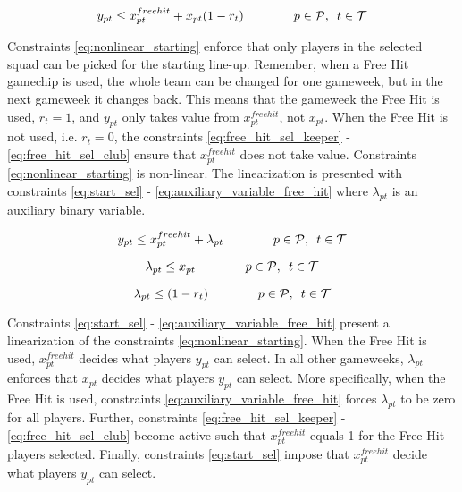 \begin{equation} \label{eq:nonlinear_starting}
    y_{pt} \leq x_{pt}^{free hit} + x_{pt}(1-r_{t}) \qquad\qquad  p \in \mathcal{P}, \enskip t \in \mathcal{T}
\end{equation}

Constraints \eqref{eq:nonlinear_starting} enforce that only players in the selected squad can be picked for the starting line-up. Remember, when a Free Hit gamechip is used, the whole team can be changed for one gameweek, but in the next gameweek it changes back. This means that the gameweek the Free Hit is used, $r_{t} = 1$, and $y_{pt}$ only takes value from $x_{pt}^{free hit}$, not $x_{pt}$. When the Free Hit is not used, i.e. $r_{t} = 0$, the constraints \eqref{eq:free_hit_sel_keeper} - \eqref{eq:free_hit_sel_club} ensure that $x_{pt}^{free hit}$ does not take value. Constraints \eqref{eq:nonlinear_starting} is non-linear. The linearization is presented with constraints \eqref{eq:start_sel} - \eqref{eq:auxiliary_variable_free_hit} where $\lambda_{pt}$ is an auxiliary binary variable.


\begin{equation}\label{eq:start_sel}
    y_{pt} \leq x_{pt}^{free hit} + \lambda_{pt} \qquad\qquad  p \in \mathcal{P}, \enskip t \in \mathcal{T}
\end{equation}

\begin{equation} \label{eq:auxiliary_variable_x}
    \lambda_{pt} \leq {x}_{pt}  \qquad\qquad  p \in \mathcal{P}, \enskip t \in \mathcal{T}
\end{equation}

\begin{equation} \label{eq:auxiliary_variable_free_hit}
    \lambda_{pt} \leq (1-r_{t}) \qquad\qquad  p \in \mathcal{P}, \enskip t \in \mathcal{T}
\end{equation}

Constraints \eqref{eq:start_sel} - \eqref{eq:auxiliary_variable_free_hit} present a linearization of the constraints \eqref{eq:nonlinear_starting}. When the Free Hit is used, $x_{pt}^{freehit}$ decides what players $y_{pt}$ can select. In all other gameweeks, $\lambda_{pt}$ enforces that $x_{pt}$ decides what players $y_{pt}$ can select. More specifically, when the Free Hit is used, constraints \eqref{eq:auxiliary_variable_free_hit} forces $\lambda_{pt}$ to be zero for all players. Further, constraints \eqref{eq:free_hit_sel_keeper} - \eqref{eq:free_hit_sel_club} become active such that $x_{pt}^{freehit}$ equals 1 for the Free Hit players selected. Finally, constraints \eqref{eq:start_sel} impose that $x_{pt}^{freehit}$ decide what players $y_{pt}$ can select. 

